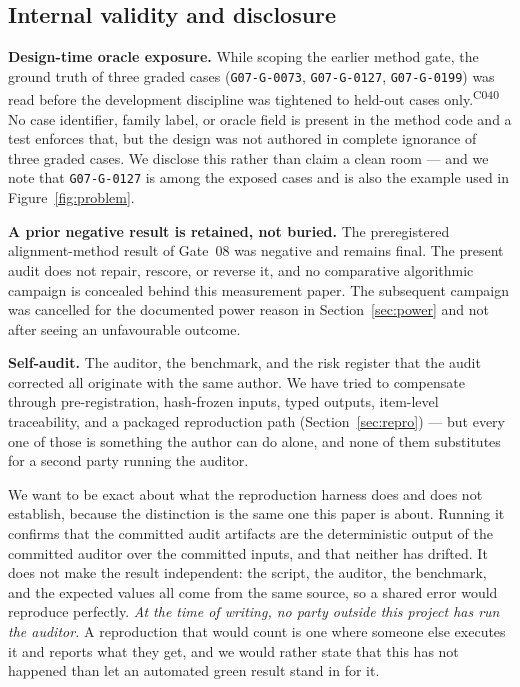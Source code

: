 \documentclass[11pt]{article}
\newcommand{\ledger}[1]{\textsuperscript{\textsf{\scriptsize #1}}}
\begin{document}
\subsection{Internal validity and disclosure}

\textbf{Design-time oracle exposure.} While scoping the earlier method gate,
the ground truth of three graded cases (\texttt{G07-G-0073},
\texttt{G07-G-0127}, \texttt{G07-G-0199}) was read before the development
discipline was tightened to held-out cases only.\ledger{C040} No case
identifier, family label, or oracle field is present in the method code and a
test enforces that, but the design was not authored in complete ignorance of
three graded cases. We disclose this rather than claim a clean room --- and we
note that \texttt{G07-G-0127} is among the exposed cases and is also the
example used in Figure~\ref{fig:problem}.

\textbf{A prior negative result is retained, not buried.} The preregistered
alignment-method result of Gate~08 was negative and remains final. The present
audit does not repair, rescore, or reverse it, and no comparative algorithmic
campaign is concealed behind this measurement paper. The subsequent campaign
was cancelled for the documented power reason in Section~\ref{sec:power} and
not after seeing an unfavourable outcome.

\textbf{Self-audit.} The auditor, the benchmark, and the risk register that
the audit corrected all originate with the same author. We have tried to
compensate through pre-registration, hash-frozen inputs, typed outputs,
item-level traceability, and a packaged reproduction path
(Section~\ref{sec:repro}) --- but every one of those is something the author
can do alone, and none of them substitutes for a second party running the
auditor.

We want to be exact about what the reproduction harness does and does not
establish, because the distinction is the same one this paper is about. Running
it confirms that the committed audit artifacts are the deterministic output of
the committed auditor over the committed inputs, and that neither has drifted.
It does not make the result independent: the script, the auditor, the
benchmark, and the expected values all come from the same source, so a shared
error would reproduce perfectly. \emph{At the time of writing, no party outside
this project has run the auditor.} A reproduction that would count is one where
someone else executes it and reports what they get, and we would rather state
that this has not happened than let an automated green result stand in for it.
\end{document}
